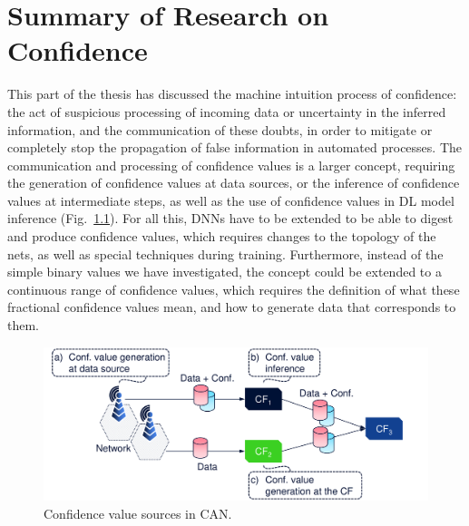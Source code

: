 \chapter{Summary of Research on Confidence}
	\label{cha:sum_confidence}
	
	This part of the thesis has discussed the machine intuition process of confidence: the act of suspicious processing of incoming data or uncertainty in the inferred information, and the communication of these doubts, in order to mitigate or completely stop the propagation of false information in automated processes.
	The communication and processing of confidence values is a larger concept, requiring the generation of confidence values at data sources, or the inference of confidence values at intermediate steps, as well as the use of confidence values in \ac{DL} model inference (Fig.~\ref{fig:gen_conf}).
	For all this, \acp{DNN} have to be extended to be able to digest and produce confidence values, which requires changes to the topology of the nets, as well as special techniques during training. 
	Furthermore, instead of the simple binary values we have investigated, the concept could be extended to a continuous range of confidence values, which requires the definition of what these fractional confidence values mean, and how to generate data that corresponds to them.

	\begin{figure}[ht]
		\centering
		\includegraphics[width=\linewidth]{figures/13_sum_confidence/gen_conf/gen_conf.pdf}
		\caption[Confidence value sources in CAN]{Confidence value sources in CAN.}
		\label{fig:gen_conf}
	\end{figure}
	
